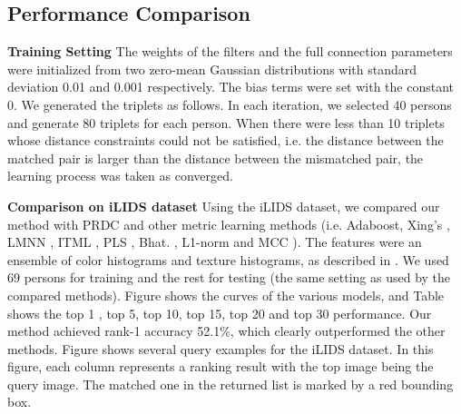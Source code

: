 \documentclass[review]{elsarticle}
\begin{document}
\subsection{Performance Comparison}

\textbf{Training Setting} The weights of the filters  and the full connection parameters were initialized from two zero-mean Gaussian distributions with standard deviation 0.01 and 0.001 respectively. The bias terms were set with the constant 0. We generated the triplets as follows. In each iteration, we selected 40 persons and generate 80 triplets for each person. When there were less than 10 triplets whose distance constraints could not be satisfied, i.e. the distance between the matched pair is larger than the distance between the mismatched pair, the learning process was taken as converged. 

\textbf{Comparison on iLIDS dataset} Using the iLIDS dataset, we compared our method with PRDC \cite{zheng2011person} and other metric learning methods (i.e. Adaboost\cite{gray2008viewpoint}, Xing's \cite{xing2002distance}, LMNN \cite{weinberger2005distance}, ITML \cite{davis2007information}, PLS \cite{schwartz2009learning}, Bhat. \cite{gray2008viewpoint}, L1-norm \cite{wang2007shape} and MCC \cite{globerson2005metric}). The features were an ensemble of color histograms and texture histograms, as described in \cite{zheng2011person}. We used 69 persons for training and the rest for testing (the same setting as used by the compared methods). Figure  shows the curves of the various models, and Table  shows the top 1 , top 5, top 10, top 15, top 20 and top 30 performance. Our method achieved rank-1 accuracy 52.1\%,  which clearly outperformed the other methods. Figure  shows several query examples for the iLIDS dataset. In this figure, each column represents a ranking result with the top image being the query image. The matched one in the returned list is marked by a red bounding box. 
\end{document}
